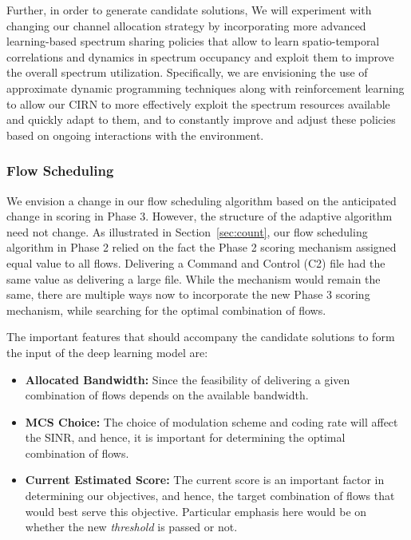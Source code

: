 \documentclass[11pt]{article}
\begin{document}
Further, in order to generate candidate solutions, We will experiment with changing our channel allocation strategy by incorporating more advanced learning-based spectrum sharing policies that allow to learn spatio-temporal correlations and dynamics in spectrum occupancy and exploit them to improve the overall spectrum utilization. Specifically, we are envisioning the use of approximate dynamic programming techniques along with reinforcement learning to allow our CIRN to more effectively exploit the spectrum resources available and quickly adapt to them, and to constantly improve and adjust these policies based on ongoing interactions with the environment. %

\subsubsection{Flow Scheduling}
We envision a change in our flow scheduling algorithm based on the anticipated change in scoring in Phase 3. However, the structure of the adaptive algorithm need not change. As illustrated in Section~\ref{sec:count}, our flow scheduling algorithm in Phase 2 relied on the fact the Phase 2 scoring mechanism assigned equal value to all flows. Delivering a Command and Control (C2) file had the same value as delivering a large file. While the mechanism would remain the same, there are multiple ways now to incorporate the new Phase 3 scoring mechanism, while searching for the optimal combination of flows. 

The important features that should accompany the candidate solutions to form the input of the deep learning model are:
\begin{itemize}
    \item {\bf Allocated Bandwidth:} Since the feasibility of delivering a given combination of flows depends on the available bandwidth.
    \item {\bf MCS Choice:} The choice of modulation scheme and coding rate will affect the SINR, and hence, it is important for determining the optimal combination of flows.
    \item {\bf Current Estimated Score:} The current score is an important factor in determining our objectives, and hence, the target combination of flows that would best serve this objective. Particular emphasis here would be on whether the new \emph{threshold} is passed or not.
\end{itemize}
\end{document}
